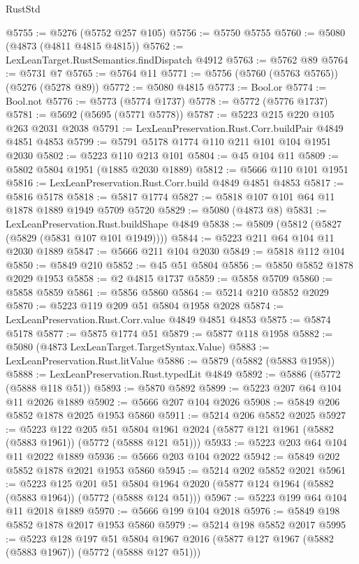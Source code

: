 \begin{lexlean}{RustStd}
\begin{coremodule}
@5755 := @5276 (@5752 @257 @105)
@5756 := @5750 @5755
@5760 := @5080 (@4873 (@4811 @4815 @4815))
@5762 := LexLeanTarget.RustSemantics.findDispatch @4912
@5763 := @5762 @89
@5764 := @5731 @7
@5765 := @5764 @11
@5771 := @5756 (@5760 (@5763 @5765)) (@5276 (@5278 @89))
@5772 := @5080 @4815
@5773 := Bool.or
@5774 := Bool.not
@5776 := @5773 (@5774 @1737)
@5778 := @5772 (@5776 @1737)
@5781 := @5692 (@5695 (@5771 @5778))
@5787 := @5223 @215 @220 @105 @263 @2031 @2038
@5791 := LexLeanPreservation.Rust.Corr.buildPair @4849 @4851 @4853
@5799 := @5791 @5178 @1774 @110 @211 @101 @104 @1951 @2030
@5802 := @5223 @110 @213 @101
@5804 := @45 @104 @11
@5809 := @5802 @5804 @1951 (@1885 @2030 @1889)
@5812 := @5666 @110 @101 @1951
@5816 := LexLeanPreservation.Rust.Corr.build @4849 @4851 @4853
@5817 := @5816 @5178
@5818 := @5817 @1774
@5827 := @5818 @107 @101 @64 @11 @1878 @1889 @1949 @5709 @5720
@5829 := @5080 (@4873 @8)
@5831 := LexLeanPreservation.Rust.buildShape @4849
@5838 := @5809 (@5812 (@5827 (@5829 (@5831 @107 @101 @1949))))
@5844 := @5223 @211 @64 @104 @11 @2030 @1889
@5847 := @5666 @211 @104 @2030
@5849 := @5818 @112 @104
@5850 := @5849 @210
@5852 := @45 @51 @5804
@5856 := @5850 @5852 @1878 @2029 @1953
@5858 := @2 @4815 @1737
@5859 := @5858 @5709
@5860 := @5858 @5859
@5861 := @5856 @5860
@5864 := @5214 @210 @5852 @2029
@5870 := @5223 @119 @209 @51 @5804 @1958 @2028
@5874 := LexLeanPreservation.Rust.Corr.value @4849 @4851 @4853
@5875 := @5874 @5178
@5877 := @5875 @1774 @51
@5879 := @5877 @118 @1958
@5882 := @5080 (@4873 LexLeanTarget.TargetSyntax.Value)
@5883 := LexLeanPreservation.Rust.litValue
@5886 := @5879 (@5882 (@5883 @1958))
@5888 := LexLeanPreservation.Rust.typedLit @4849
@5892 := @5886 (@5772 (@5888 @118 @51))
@5893 := @5870 @5892
@5899 := @5223 @207 @64 @104 @11 @2026 @1889
@5902 := @5666 @207 @104 @2026
@5908 := @5849 @206 @5852 @1878 @2025 @1953 @5860
@5911 := @5214 @206 @5852 @2025
@5927 := @5223
    @122
    @205
    @51
    @5804
    @1961
    @2024
    (@5877 @121 @1961 (@5882 (@5883 @1961)) (@5772 (@5888 @121 @51)))
@5933 := @5223 @203 @64 @104 @11 @2022 @1889
@5936 := @5666 @203 @104 @2022
@5942 := @5849 @202 @5852 @1878 @2021 @1953 @5860
@5945 := @5214 @202 @5852 @2021
@5961 := @5223
    @125
    @201
    @51
    @5804
    @1964
    @2020
    (@5877 @124 @1964 (@5882 (@5883 @1964)) (@5772 (@5888 @124 @51)))
@5967 := @5223 @199 @64 @104 @11 @2018 @1889
@5970 := @5666 @199 @104 @2018
@5976 := @5849 @198 @5852 @1878 @2017 @1953 @5860
@5979 := @5214 @198 @5852 @2017
@5995 := @5223
    @128
    @197
    @51
    @5804
    @1967
    @2016
    (@5877 @127 @1967 (@5882 (@5883 @1967)) (@5772 (@5888 @127 @51)))

\end{coremodule}
\end{lexlean}
